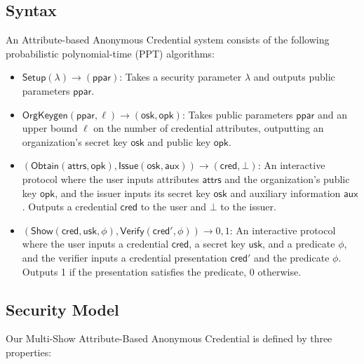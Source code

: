 \subsection{Syntax}
\begin{definition}\label{chap2_abc_system_definition}
An Attribute-based Anonymous Credential system consists of the following probabilistic polynomial-time (PPT) algorithms:
\begin{itemize}
\item $\mathsf{Setup}(\lambda) \to (\mathsf{ppar})$: Takes a security parameter $\lambda$ and outputs public parameters $\mathsf{ppar}$.

\item $\mathsf{OrgKeygen}(\mathsf{ppar}, \ell) \to (\mathsf{osk}, \mathsf{opk})$: Takes public parameters $\mathsf{ppar}$ and an upper bound $\ell$ on the number of credential attributes, outputting an organization's secret key $\mathsf{osk}$ and public key $\mathsf{opk}$.

\item $(\mathsf{Obtain}(\mathsf{attrs}, \mathsf{opk}), \mathsf{Issue}(\mathsf{osk}, \mathsf{aux})) \to (\mathsf{cred}, \bot)$: An interactive protocol where the user inputs attributes $\mathsf{attrs}$ and the organization's public key $\mathsf{opk}$, and the issuer inputs its secret key $\mathsf{osk}$ and auxiliary information $\mathsf{aux}$. Outputs a credential $\mathsf{cred}$ to the user and $\bot$ to the issuer.

\item $(\mathsf{Show}(\mathsf{cred}, \mathsf{usk}, \phi), \mathsf{Verify}(\mathsf{cred}', \phi)) \to {0,1}$: An interactive protocol where the user inputs a credential $\mathsf{cred}$, a secret key $\mathsf{usk}$, and a predicate $\phi$, and the verifier inputs a credential presentation $\mathsf{cred}'$ and the predicate $\phi$. Outputs 1 if the presentation satisfies the predicate, 0 otherwise.
\end{itemize}
\end{definition}

\subsection{Security Model}


Our Multi-Show Attribute-Based Anonymous Credential is defined by three properties:

